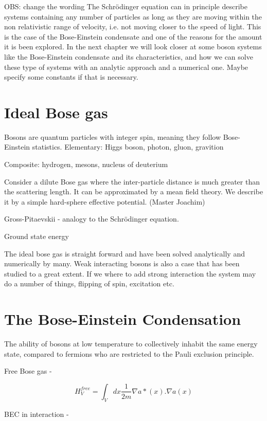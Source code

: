 OBS: change the wording
The Schrödinger equation can in principle describe systems containing any number of particles as long as they are moving within the non relativistic range of velocity, i.e. not moving closer to the speed of light. This is the case of the Bose-Einstein condensate and one of the reasons for the amount it is been explored. 
In the next chapter we will look closer at some boson systems like the Bose-Einstein condensate and its characteristics, and how we can solve these type of systems with an analytic approach and a numerical one. 
Maybe specify some constants if that is necessary. 

\section{Ideal Bose gas}
Bosons are quantum particles with integer spin, meaning they follow Bose-Einstein statistics. 
Elementary: Higgs boson, photon, gluon, gravition

Composite: hydrogen, mesons, nucleus of deuterium

Consider a dilute Bose gas where the inter-particle distance is much greater than the scattering length. It can be approximated by a mean field theory. We describe it by a simple hard-sphere effective potential. (Master Joachim)

Gross-Pitaevskii - analogy to the Schrödinger equation. 

Ground state energy

The ideal bose gas is straight forward and have been solved analytically and numerically by many. Weak interacting bosons is also a case that has been studied to a great extent. If we where to add strong interaction the system may do a number of things, flipping of spin, excitation etc.


\section{The Bose-Einstein Condensation}
The ability of bosons at low temperature to collectively inhabit the same energy state, compared to fermions who are restricted to the Pauli exclusion principle.

Free Bose gas - 

\begin{equation} \label{eq:hamilt_free_bose_gas}
H^{free}_V = \int_V dx \frac{1}{2m} \nabla a*(x). \nabla a(x)
\end{equation}

BEC in interaction - 

